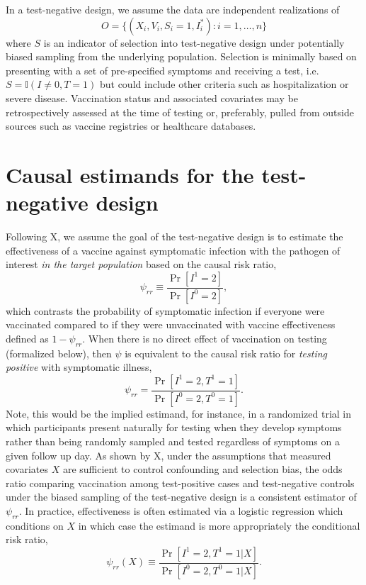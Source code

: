 \documentclass[11pt]{article}
\begin{document}
In a test-negative design, we assume the data are independent realizations of 
$$O = \{(X_i, V_i, S_i = 1, I^*_i) : i = 1, \ldots, n\}$$
where $S$ is an indicator of selection into test-negative design under potentially biased sampling from the underlying population. Selection is minimally based on presenting with a set of pre-specified symptoms and receiving a test, i.e. $S = \mathbb{I}(I \neq 0, T = 1)$ but could include other criteria such as hospitalization or severe disease. Vaccination status and associated covariates may be retrospectively assessed at the time of testing or, preferably, pulled from outside sources such as vaccine registries or healthcare databases. 

\section{Causal estimands for the test-negative design} \label{sec:estimands}
Following X, we assume the goal of the test-negative design is to estimate the effectiveness of a vaccine against symptomatic infection with the pathogen of interest \textit{in the target population} based on the causal risk ratio,
\begin{equation*}
    \psi_{rr} \equiv \dfrac{\Pr[I^1 = 2]}{\Pr[I^0 = 2]},
\end{equation*}
which contrasts the probability of symptomatic infection if everyone were vaccinated compared to if they were unvaccinated with vaccine effectiveness defined as $1 - \psi_{rr}$. When there is no direct effect of vaccination on testing (formalized below), then $\psi$ is equivalent to the causal risk ratio for \textit{testing positive} with symptomatic illness,
\begin{equation*}
    \psi_{rr} = \dfrac{\Pr[I^1 = 2, T^1 = 1]}{\Pr[I^0 = 2, T^0 = 1]}.
\end{equation*}
Note, this would be the implied estimand, for instance, in a randomized trial in which participants present naturally for testing when they develop symptoms rather than being randomly sampled and tested regardless of symptoms on a given follow up day. As shown by X, under the assumptions that measured covariates $X$ are sufficient to control confounding and selection bias, the odds ratio comparing vaccination among test-positive cases and test-negative controls under the biased sampling of the test-negative design is a consistent estimator of $\psi_{rr}$. In practice, effectiveness is often estimated via a logistic regression which conditions on $X$ in which case the estimand is more appropriately the conditional risk ratio,
\begin{equation*}
    \psi_{rr}(X) \equiv \dfrac{\Pr[I^1 = 2, T^1 = 1 | X]}{\Pr[I^0 = 2, T^0 = 1 | X]}.
\end{equation*}
\end{document}
